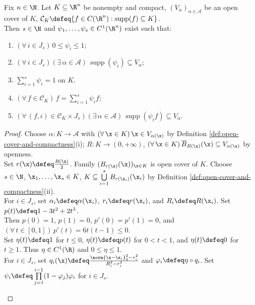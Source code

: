 \begin{theorem} \label{thm:partition-of-unity-rudin} \\
Fix $n\in\N$. Let $K\subseteq\R^n$ be nonempty and compact, $(V_\alpha)_{\alpha\in\mathcal A}$ be an open cover of $K$, $\mathcal C_K\defeq\{f\in C(\R^n):\operatorname{supp}(f)\subseteq K\}$.\\
Then $s\in\N$ and $\psi_1,\ldots,\psi_s\in C^1(\R^n)$ exist such that:
\begin{enumerate}[label=(\roman*)]
\setlength{\itemsep}{0pt}
\item $(\forall\,i\in J_s)\,0\leq\psi_i\leq1$;
\item $(\forall\,i\in J_s)(\exists\,\alpha\in\mathcal A)\,\operatorname{supp}(\psi_i)\subseteq V_\alpha$;
\item $\sum\limits_{i=1}^s\psi_i=1$ on $K$.
\item $(\forall\,f\in\mathcal C_K)\,f=\sum\limits_{i=1}^{s}\psi_i f$;
\item $(\forall\,(f,i)\in\mathcal C_K\times J_s)(\exists\,\alpha\in\mathcal A)\,\operatorname{supp}(\psi_i f)\subseteq V_\alpha$.
\end{enumerate}
\begin{proof}
Choose $\alpha:K\to\mathcal A$ with $(\forall\,\x\in K)\,\x\in V_{\alpha(\x)}$ by Definition \ref{def:open-cover-and-compactness}(i); $R:K\to(0,+\infty)$, $(\forall\,\x\in K)\,\overline{B}_{R(\x)}(\x)\subseteq V_{\alpha(\x)}$ by openness.\\
Set $r(\x)\defeq\frac{R(\x)}{2}$. Family $(B_{r(\x)}(\x))_{\x\in K}$ is open cover of $K$. Choose $s\in\N$, $\x_1,\ldots,\x_s\in K$, $K\subseteq\bigcup\limits_{i=1}^{s}B_{r(\x_i)}(\x_i)$ by Definition \ref{def:open-cover-and-compactness}(ii).\\
For $i\in J_s$, set $\alpha_i\defeq\alpha(\x_i)$, $r_i\defeq r(\x_i)$, and $R_i\defeq R(\x_i)$. Set $p(t)\defeq1-3t^2+2t^3$.\\
Then $p(0)=1$, $p(1)=0$, $p'(0)=p'(1)=0$, and $(\forall\,t\in[0,1])\,p'(t)=6t(t-1)\leq0$.\\
Set $\eta(t)\defeq1$ for $t\leq0$, $\eta(t)\defeq p(t)$ for $0<t<1$, and $\eta(t)\defeq0$ for $t\geq1$. Thus $\eta\in C^1(\R)$ and $0\leq\eta\leq1$.\\
For $i\in J_s$, set $q_i(\x)\defeq\frac{\norm{\x-\x_i}_2^2-r_i^2}{R_i^2-r_i^2}$ and $\varphi_i\defeq\eta\circ q_i$. Set $\psi_i\defeq\prod\limits_{j=1}^{i-1}(1-\varphi_j)\varphi_i$ for $i\in J_s$.
\begin{enumerate}[label=(\roman*)]

\end{enumerate}
\end{proof}
\end{theorem}
